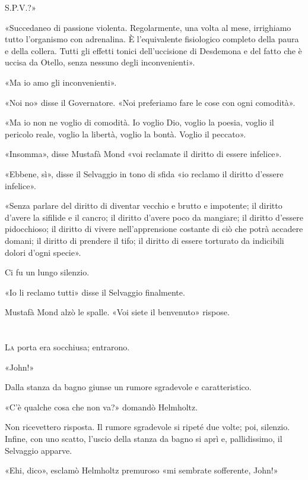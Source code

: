\documentclass[
a5paper, %
10pt, %
twoside, 
onecolumn, %
openany, %
]{memoir}
\begin{document}
S.P.V.?»

«Succedaneo di passione violenta. Regolarmente, una volta al mese, irrighiamo tutto l’organismo con adrenalina. È l’equivalente fisiologico completo della paura e della collera. Tutti gli effetti tonici dell’uccisione di Desdemona e del fatto che è uccisa da Otello, senza nessuno degli inconvenienti».

«Ma io amo gli inconvenienti».

«Noi no» disse il Governatore. «Noi preferiamo fare le cose con ogni comodità».

«Ma io non ne voglio di comodità. Io voglio Dio, voglio la poesia, voglio il pericolo reale, voglio la libertà, voglio la bontà. Voglio il peccato».

«Insomma», disse Mustafà Mond «voi reclamate il diritto di essere infelice».

«Ebbene, sì», disse il Selvaggio in tono di sfida «io reclamo il diritto d’essere infelice».

«Senza parlare del diritto di diventar vecchio e brutto e impotente; il diritto d’avere la sifilide e il cancro; il diritto d’avere poco da mangiare; il diritto d’essere pidocchioso; il diritto di vivere nell’apprensione costante di ciò che potrà accadere domani; il diritto di prendere il tifo; il diritto di essere torturato da indicibili dolori d’ogni specie».

Ci fu un lungo silenzio.

«Io li reclamo tutti» disse il Selvaggio finalmente.

Mustafà Mond alzò le spalle. «Voi siete il benvenuto» rispose.

\chapter{\phantom{title}}

\lettrine{L}{a} porta era socchiusa; entrarono.

«John!»

Dalla stanza da bagno giunse un rumore sgradevole e caratteristico.

«C’è qualche cosa che non va?» domandò Helmholtz.

Non ricevettero risposta. Il rumore sgradevole si ripeté due volte; poi, silenzio. Infine, con uno scatto, l’uscio della stanza da bagno si aprì e, pallidissimo, il Selvaggio apparve.

«Ehi, dico», esclamò Helmholtz premuroso «mi sembrate sofferente, John!»
\end{document}
